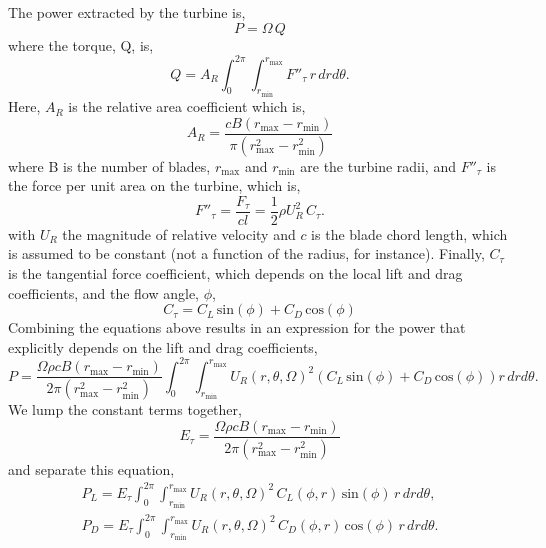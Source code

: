 The power extracted by the turbine is, 
\begin{equation}
 P = \Omega \, Q
\end{equation}
where the torque, Q, is\cite{morgado2014validation}, 
\begin{equation}
 Q = A_R \int_0^{2\pi} \int_{r_{\text{min}}}^{r_{\text{max}}} F''_{\tau}\, r\, dr d\theta.
\end{equation}
Here, $A_R$ is the relative area coefficient which is, 
\begin{equation}
A_R = \frac{c B (r_{\text{max}}-r_{\text{min}})}{\pi(r_{\text{max}}^2-r_{\text{min}}^2)}
\end{equation}
where B is the number of blades, $r_{\text{max}}$ and $r_{\text{min}}$
are the turbine radii, and $F''_{\tau}$ is the force per unit
area on the turbine, which is, 
\begin{equation}
 F''_{\tau} = \frac{F_{\tau}}{cl}= \frac{1}{2}\rho U_R^2 \, C_{\tau}.
\end{equation}
with $U_R$ the magnitude of relative velocity and $c$ is the blade chord
length, which is assumed to be constant (not a function of the radius,
for instance). Finally, $C_{\tau}$ is the tangential force coefficient,
which depends on the local lift and drag coefficients, and the
flow angle, $\phi$, 
\begin{equation}
 C_{\tau} = C_L \,\text{sin}(\phi) + C_D \,\text{cos}(\phi)
\end{equation}
Combining the equations above results in an expression for the power
that explicitly depends on the lift and drag coefficients, 
\begin{equation*}
 P = \frac{\Omega \rho c B (r_{\text{max}}-r_{\text{min}})}{2 \pi(r_{\text{max}}^2-r_{\text{min}}^2)}
\int_0^{2\pi}
\int_{r_{\text{min}}}^{r_{\text{max}}} U_R(r,\theta,\Omega)^2 \left(C_L
						     \,\text{sin}(\phi)
						     + C_D
						     \,\text{cos}(\phi)
						    \right) r\,dr d\theta. 
\end{equation*}
We lump the constant terms together, 
\begin{equation}
E_{\tau} = \frac{\Omega \rho c B (r_{\text{max}}-r_{\text{min}})}{2
 \pi(r_{\text{max}}^2-r_{\text{min}}^2)}
\end{equation}
 and separate this equation, 
\begin{align}
 P_L = E_\tau
 \int_0^{2\pi}
  \int_{r_{\text{min}}}^{r_{\text{max}}} U_R(r,\theta,\Omega)^2 \, C_L(\phi,r)
 \,\text{sin}(\phi)\, r\,dr d\theta,  \label{lift} \\
 P_D = E_\tau
 \int_0^{2\pi}
  \int_{r_{\text{min}}}^{r_{\text{max}}} U_R(r,\theta,\Omega)^2 \, C_D(\phi,r) \,\text{cos}(\phi)\, r\,dr d\theta. \label{drag}
\end{align}

